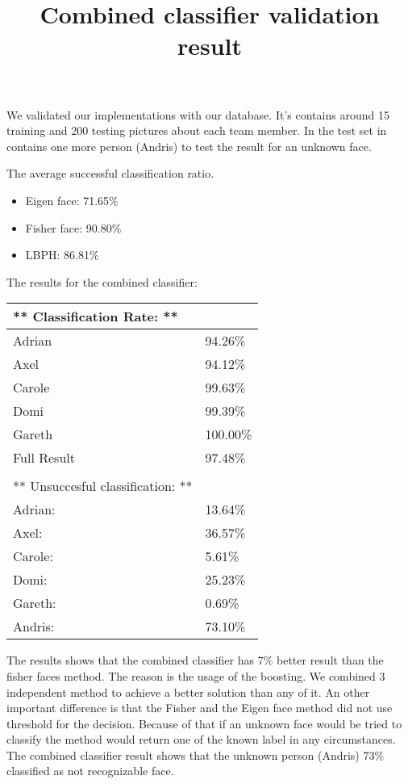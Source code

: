 We validated our implementations with our database. It's contains around 15 training and 200 testing pictures about each team member. In the test set in contains one more person (Andris) to test the result for an unknown face.

The average successful classification ratio.
\begin{itemize}
	\item Eigen face: 71.65\%
	\item Fisher face: 90.80\%
	\item LBPH: 86.81\%
\end{itemize}

The results for the combined classifier:
\begin{table}[h]
	\begin{tabular}{l|l}
		** Classification Rate:                ** &          \\ \hline
		Adrian                                    & 94.26\%  \\
		Axel                                      & 94.12\%  \\
		Carole                                    & 99.63\%  \\
		Domi                                      & 99.39\%  \\
		Gareth                                    & 100.00\% \\ \hline
		Full Result                               & 97.48\%  \\ 
		\\
		** Unsuccesful classification:         ** &          \\ \hline
		Adrian:                                   & 13.64\%  \\
		Axel:                                     & 36.57\%  \\
		Carole:                                   & 5.61\%   \\
		Domi:                                     & 25.23\%  \\
		Gareth:                                   & 0.69\%  \\ \hline
		Andris:                                   & 73.10\%  
	\end{tabular}
	\label{CombinedResult}
	\title{Combined classifier validation result}
\end{table}

The results shows that the combined classifier has 7\% better result than the fisher faces method. The reason is the usage of the boosting. We combined 3 independent method to achieve a better solution than any of it. An other important difference is that the Fisher and the Eigen face method did not use threshold for the decision. Because of that if an unknown face would be tried to classify the method would return one of the known label in any circumstances. The combined classifier result shows that the unknown person (Andris) 73\% classified as not recognizable face.

